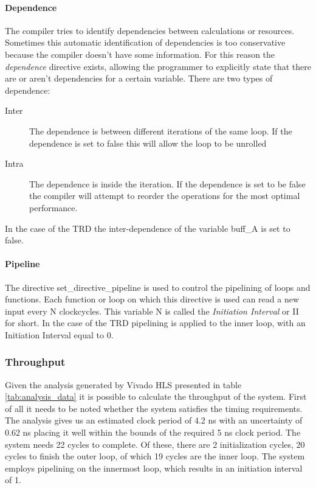 \paragraph{Dependence} The compiler tries to identify dependencies between calculations or resources. Sometimes this automatic identification of dependencies is too conservative because the compiler doesn't have some information. For this reason the \emph{dependence} directive exists, allowing the programmer to explicitly state that there are or aren't dependencies for a certain variable. There are two types of dependence:

\begin{description}
\item[Inter] The dependence is between different iterations of the same loop. If the dependence is set to false this will allow the loop to be unrolled
\item[Intra] The dependence is inside the iteration. If the dependence is set to be false the compiler will attempt to reorder the operations for the most optimal performance.
\end{description}

In the case of the TRD the inter-dependence of the variable buff\_A is set to false.

\paragraph{Pipeline} The directive set\_directive\_pipeline is used to control the pipelining of loops and functions. Each function or loop on which this directive is used can read a new input every N clockcycles. This variable N is called the \emph{Initiation Interval} or II for short. In the case of the TRD pipelining is applied to the inner loop, with an Initiation Interval equal to 0.


\subsubsection{Throughput}
\label{sec:original_througput}

Given the analysis generated by Vivado HLS presented in table \ref{tab:analysis_data} it is possible to calculate the throughput of the system. First of all it needs to be noted whether the system satisfies the timing requirements. The analysis gives us an estimated clock period of 4.2 ns with an uncertainty of 0.62 ns placing it well within the bounds of the required 5 ns clock period.
The system needs 22 cycles to complete. Of these, there are 2 initialization cycles, 20 cycles to finish the outer loop, of which 19 cycles are the inner loop. The system employs pipelining on the innermost loop, which results in an initiation interval of 1.

